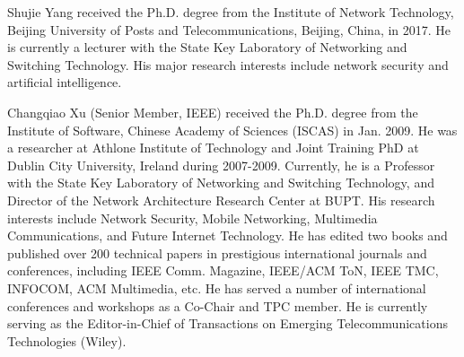 \documentclass[lettersize,journal]{IEEEtran}
\begin{document}
\begin{IEEEbiography}{Shujie Yang} received the Ph.D. degree from the Institute of Network Technology, Beijing University of Posts and Telecommunications, Beijing, China, in 2017. He is currently a lecturer with the State Key Laboratory of Networking and Switching Technology. His major research interests include network security and artificial intelligence.
\end{IEEEbiography}

\vspace{11pt}

\begin{IEEEbiography}{Changqiao Xu}
(Senior Member, IEEE) received the Ph.D. degree from the Institute of Software, Chinese Academy of Sciences (ISCAS) in Jan. 2009. He was a researcher at Athlone Institute of Technology and Joint Training PhD at Dublin City University, Ireland during 2007-2009. %
Currently, he is a Professor with the State Key Laboratory of Networking and Switching Technology, and Director of the Network Architecture Research Center at BUPT. His research interests include Network Security, Mobile Networking, Multimedia Communications, and Future Internet Technology. He has edited two books and published over 200 technical papers in prestigious international journals and conferences, including IEEE Comm. Magazine, IEEE/ACM ToN, IEEE TMC, INFOCOM, ACM Multimedia, etc. He has served a number of international conferences and workshops as a Co-Chair and TPC member. He is currently serving as the Editor-in-Chief of Transactions on Emerging Telecommunications Technologies (Wiley).
\end{IEEEbiography}


\end{document}
